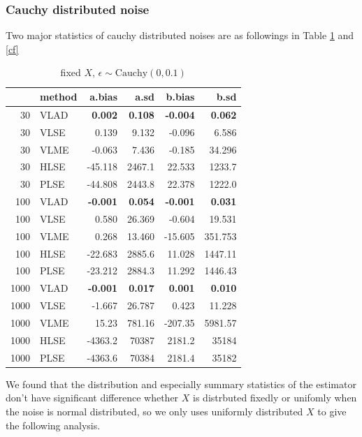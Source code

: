 \documentclass[twoside]{article}
\begin{document}
\subsubsection*{Cauchy distributed noise}

Two major statistics of cauchy distributed noises are as followings in Table \ref{cu} and \ref{cf}

\begin{table}[ht]
\centering
\caption{fixed $X$, $\epsilon \sim \mathrm{Cauchy}(0,0.1)$}
\begin{tabular}{rlrrrr}
  \hline
 & method & a.bias & a.sd & b.bias & b.sd \\ 
  \hline
  30 & VLAD & \textbf{0.002} & \textbf{0.108} & \textbf{-0.004} & \textbf{0.062} \\ 
  30 & VLSE & 0.139 & 9.132 & -0.096 & 6.586 \\ 
  30 & VLME & -0.063 & 7.436 & -0.185 & 34.296 \\ 
  30 & HLSE & -45.118 & 2467.1 & 22.533 & 1233.7 \\ 
  30 & PLSE & -44.808 & 2443.8 & 22.378 & 1222.0 \\ 
  \hline
  100 & VLAD & \textbf{-0.001} & \textbf{0.054} & \textbf{-0.001} & \textbf{0.031} \\ 
  100 & VLSE & 0.580 & 26.369 & -0.604 & 19.531 \\ 
  100 & VLME & 0.268 & 13.460 & -15.605 & 351.753 \\ 
  100 & HLSE & -22.683 & 2885.6 & 11.028 & 1447.11 \\ 
  100 & PLSE & -23.212 & 2884.3 & 11.292 & 1446.43 \\ 
  \hline
  1000 & VLAD & \textbf{-0.001} & \textbf{0.017} & \textbf{0.001} & \textbf{0.010} \\ 
  1000 & VLSE & -1.667 & 26.787 & 0.423 & 11.228 \\ 
  1000 & VLME & 15.23 & 781.16 & -207.35 & 5981.57 \\ 
  1000 & HLSE & -4363.2 & 70387 & 2181.2 & 35184 \\ 
  1000 & PLSE & -4363.6 & 70384 & 2181.4 & 35182 \\ 
  \hline
\end{tabular}
\label{cu}
\end{table}

We found that the distribution and especially summary statistics of the estimator don't have significant difference whether $X$ is distrbuted fixedly or unifomly when the noise is normal distributed, so we only uses uniformly distributed $X$ to give the following analysis.
\end{document}
